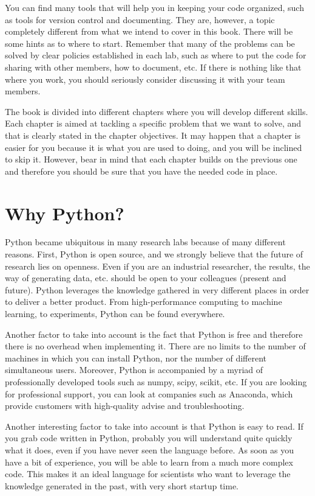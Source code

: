 You can find many tools that will help you in keeping your code organized, such as tools for version control and documenting. They are, however, a topic completely different from what we intend to cover in this book. There will be some hints as to where to start. Remember that many of the problems can be solved by clear policies established in each lab, such as where to put the code for sharing with other members, how to document, etc. If there is nothing like that where you work, you should seriously consider discussing it with your team members.

The book is divided into different chapters where you will develop different skills. Each chapter is aimed at tackling a specific problem that we want to solve, and that is clearly stated in the chapter objectives. It may happen that a chapter is easier for you because it is what you are used to doing, and you will be inclined to skip it. However, bear in mind that each chapter builds on the previous one and therefore you should be sure that you have the needed code in place.

\section{Why Python?}
Python became ubiquitous in many research labs because of many different reasons. First, Python is open source, and we strongly believe that the future of research lies on openness. Even if you are an industrial researcher, the results, the way of generating data, etc. should be open to your colleagues (present and future). Python leverages the knowledge gathered in very different places in order to deliver a better product. From high-performance computing to machine learning, to experiments, Python can be found everywhere. 

Another factor to take into account is the fact that Python is free and therefore there is no overhead when implementing it. There are no limits to the number of machines in which you can install Python, nor the number of different simultaneous users. Moreover, Python is accompanied by a myriad of professionally developed tools such as numpy, scipy, scikit, etc. If you are looking for professional support, you can look at companies such as Anaconda, which provide customers with high-quality advise and troubleshooting. 

Another interesting factor to take into account is that Python is easy to read. If you grab code written in Python, probably you will understand quite quickly what it does, even if you have never seen the language before. As soon as you have a bit of experience, you will be able to learn from a much more complex code. This makes it an ideal language for scientists who want to leverage the knowledge generated in the past, with very short startup time. 

